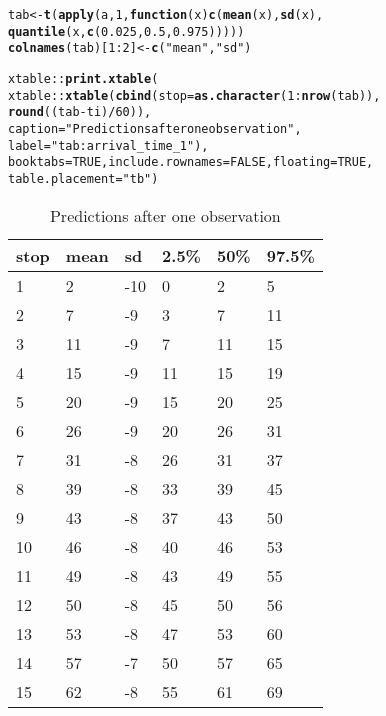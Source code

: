 \documentclass[11pt]{article}\usepackage[]{graphicx}\usepackage[]{color}
\makeatletter
\newcommand{\hlnum}[1]{\textcolor[rgb]{0.686,0.059,0.569}{#1}}%
\newcommand{\hlstr}[1]{\textcolor[rgb]{0.192,0.494,0.8}{#1}}%
\newcommand{\hlopt}[1]{\textcolor[rgb]{0,0,0}{#1}}%
\newcommand{\hlstd}[1]{\textcolor[rgb]{0.345,0.345,0.345}{#1}}%
\newcommand{\hlkwa}[1]{\textcolor[rgb]{0.161,0.373,0.58}{\textbf{#1}}}%
\newcommand{\hlkwb}[1]{\textcolor[rgb]{0.69,0.353,0.396}{#1}}%
\newcommand{\hlkwc}[1]{\textcolor[rgb]{0.333,0.667,0.333}{#1}}%
\newcommand{\hlkwd}[1]{\textcolor[rgb]{0.737,0.353,0.396}{\textbf{#1}}}%
\newenvironment{kframe}{%
 \def\at@end@of@kframe{}%
 \ifinner\ifhmode%
  \def\at@end@of@kframe{\end{minipage}}%
  \begin{minipage}{\columnwidth}%
 \fi\fi%
 \def\FrameCommand##1{\hskip\@totalleftmargin \hskip-\fboxsep
 \colorbox{shadecolor}{##1}\hskip-\fboxsep
     \hskip-\linewidth \hskip-\@totalleftmargin \hskip\columnwidth}%
 \MakeFramed {\advance\hsize-\width
   \@totalleftmargin\z@ \linewidth\hsize
   \@setminipage}}%
 {\par\unskip\endMakeFramed%
 \at@end@of@kframe}
\makeatother
\begin{document}
\begin{kframe}
\begin{alltt}
\hlstd{tab} \hlkwb{<-} \hlkwd{t}\hlstd{(}\hlkwd{apply}\hlstd{(a,} \hlnum{1}\hlstd{,} \hlkwa{function}\hlstd{(}\hlkwc{x}\hlstd{)} \hlkwd{c}\hlstd{(}\hlkwd{mean}\hlstd{(x),} \hlkwd{sd}\hlstd{(x),}
                                   \hlkwd{quantile}\hlstd{(x,} \hlkwd{c}\hlstd{(}\hlnum{0.025}\hlstd{,} \hlnum{0.5}\hlstd{,} \hlnum{0.975}\hlstd{)))))}
\hlkwd{colnames}\hlstd{(tab)[}\hlnum{1}\hlopt{:}\hlnum{2}\hlstd{]} \hlkwb{<-} \hlkwd{c}\hlstd{(}\hlstr{"mean"}\hlstd{,} \hlstr{"sd"}\hlstd{)}

\hlstd{xtable}\hlopt{::}\hlkwd{print.xtable}\hlstd{(}
    \hlstd{xtable}\hlopt{::}\hlkwd{xtable}\hlstd{(}\hlkwd{cbind}\hlstd{(}\hlkwc{stop} \hlstd{=} \hlkwd{as.character}\hlstd{(}\hlnum{1}\hlopt{:}\hlkwd{nrow}\hlstd{(tab)),}
                         \hlkwd{round}\hlstd{((tab} \hlopt{-} \hlstd{ti)} \hlopt{/} \hlnum{60}\hlstd{)),}
                   \hlkwc{caption} \hlstd{=} \hlstr{"Predictions after one observation"}\hlstd{,}
                   \hlkwc{label} \hlstd{=} \hlstr{"tab:arrival_time_1"}\hlstd{),}
    \hlkwc{booktabs} \hlstd{=} \hlnum{TRUE}\hlstd{,} \hlkwc{include.rownames} \hlstd{=} \hlnum{FALSE}\hlstd{,} \hlkwc{floating} \hlstd{=} \hlnum{TRUE}\hlstd{,}
    \hlkwc{table.placement} \hlstd{=} \hlstr{"tb"}\hlstd{)}
\end{alltt}
\end{kframe}%
\begin{table}[tb]
\centering
\begin{tabular}{llllll}
  \toprule
stop & mean & sd & 2.5\% & 50\% & 97.5\% \\ 
  \midrule
1 & 2 & -10 & 0 & 2 & 5 \\ 
  2 & 7 & -9 & 3 & 7 & 11 \\ 
  3 & 11 & -9 & 7 & 11 & 15 \\ 
  4 & 15 & -9 & 11 & 15 & 19 \\ 
  5 & 20 & -9 & 15 & 20 & 25 \\ 
  6 & 26 & -9 & 20 & 26 & 31 \\ 
  7 & 31 & -8 & 26 & 31 & 37 \\ 
  8 & 39 & -8 & 33 & 39 & 45 \\ 
  9 & 43 & -8 & 37 & 43 & 50 \\ 
  10 & 46 & -8 & 40 & 46 & 53 \\ 
  11 & 49 & -8 & 43 & 49 & 55 \\ 
  12 & 50 & -8 & 45 & 50 & 56 \\ 
  13 & 53 & -8 & 47 & 53 & 60 \\ 
  14 & 57 & -7 & 50 & 57 & 65 \\ 
  15 & 62 & -8 & 55 & 61 & 69 \\ 
   \bottomrule
\end{tabular}
\caption{Predictions after one observation} 
\label{tab:arrival_time_1}
\end{table}
\end{document}
